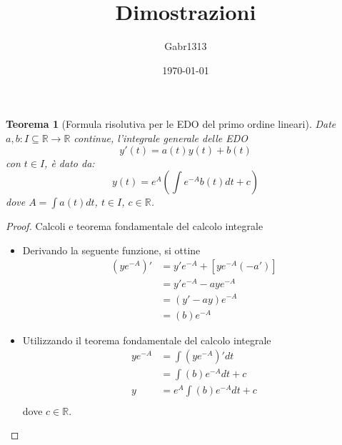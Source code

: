 \documentclass[12pt, a4paper]{article}
\title{Dimostrazioni}
\author{Gabr1313}
\date{\today}
\theoremstyle{break}
\newtheorem{theorem}{Teorema} %
\begin{document}
\justify
\sloppy
\maketitle
\listoftheorems

\newpage
\begin{theorem} [Formula risolutiva per le EDO del primo ordine lineari]
	Date $a, b: I \subseteq \mathbb{R} \to \mathbb{R}$ continue,
	l'integrale generale delle EDO
	\[
		y'(t) = a(t) y(t) + b(t)
	\]
	con $t \in I $, è dato da:
	\[
		y(t) = e^A \left( \int e^{-A} b(t) dt + c \right)
	\]
	dove $A = \int a(t) dt$, $t \in I$, $c \in \mathbb{R}$.
\end{theorem}
\begin{proof} Calcoli e teorema fondamentale del calcolo integrale
	\begin{itemize}
		\item Derivando la seguente funzione, si ottine
			\begin{align*}
				(y e^{-A})' & = y' e^{-A} + [ye^{-A}(-a')] \\
				            & = y' e^{-A} - aye^{-A}       \\
				            & = (y' - ay)e^{-A}            \\
				            & = (b)e^{-A}
			\end{align*}
		\item Utilizzando il teorema fondamentale del calcolo integrale
			\begin{align*}
				y e^{-A} & = \int (y e^{-A})' dt       \\
				         & = \int (b)e^{-A} dt + c     \\
				y        & = e^A \int (b)e^{-A} dt + c \\
			\end{align*}
			dove $c \in \mathbb{R}$.
	\end{itemize}
\end{proof}
\end{document}
